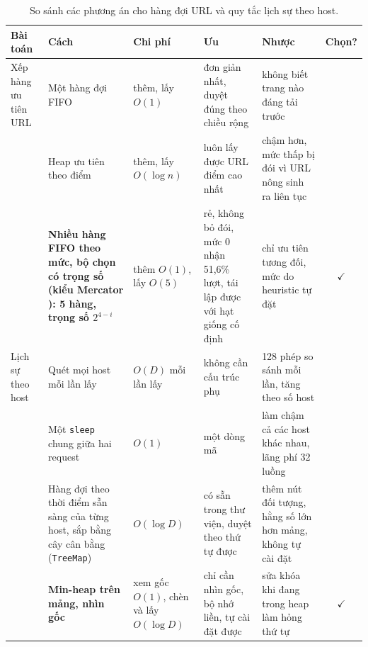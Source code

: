 \documentclass[9pt,twocolumn,a4paper]{extarticle}
\newcommand{\code}[1]{\texttt{#1}}
\begin{document}
\begin{table}[!t]
\centering
\caption{So sánh các phương án cho hàng đợi URL và quy tắc lịch sự theo host.}
\label{tab:cmp1a}
\footnotesize
\begin{tabular}{@{}p{1.9cm}p{3.0cm}p{3.0cm}p{3.5cm}p{3.7cm}c@{}}
\toprule
Bài toán & Cách & Chi phí & Ưu & Nhược & Chọn? \\
\midrule
Xếp hàng ưu tiên URL
& Một hàng đợi FIFO & thêm, lấy $O(1)$ & đơn giản nhất, duyệt đúng theo chiều rộng & không biết trang nào đáng tải trước & \\
& Heap ưu tiên theo điểm & thêm, lấy $O(\log n)$ & luôn lấy được URL điểm cao nhất & chậm hơn, mức thấp bị đói vì URL nông sinh ra liên tục & \\
& \textbf{Nhiều hàng FIFO theo mức, bộ chọn có trọng số (kiểu Mercator \cite{heydon1999mercator}): 5 hàng, trọng số $2^{4-i}$} & thêm $O(1)$, lấy $O(5)$ & rẻ, không bỏ đói, mức 0 nhận 51,6\% lượt, tái lập được với hạt giống cố định & chỉ ưu tiên tương đối, mức do heuristic tự đặt & $\checkmark$ \\
\midrule
Lịch sự theo host
& Quét mọi host mỗi lần lấy & $O(D)$ mỗi lần lấy & không cần cấu trúc phụ & 128 phép so sánh mỗi lần, tăng theo số host & \\
& Một \code{sleep} chung giữa hai request & $O(1)$ & một dòng mã & làm chậm cả các host khác nhau, lãng phí 32 luồng & \\
& Hàng đợi theo thời điểm sẵn sàng của từng host, sắp bằng cây cân bằng (\code{TreeMap}) & $O(\log D)$ & có sẵn trong thư viện, duyệt theo thứ tự được & thêm nút đối tượng, hằng số lớn hơn mảng, không tự cài đặt & \\
& \textbf{Min-heap trên mảng, nhìn gốc} \cite{cormen2009} & xem gốc $O(1)$, chèn và lấy $O(\log D)$ & chỉ cần nhìn gốc, bộ nhớ liền, tự cài đặt được & sửa khóa khi đang trong heap làm hỏng thứ tự & $\checkmark$ \\
\bottomrule
\end{tabular}
\end{table}
\end{document}
